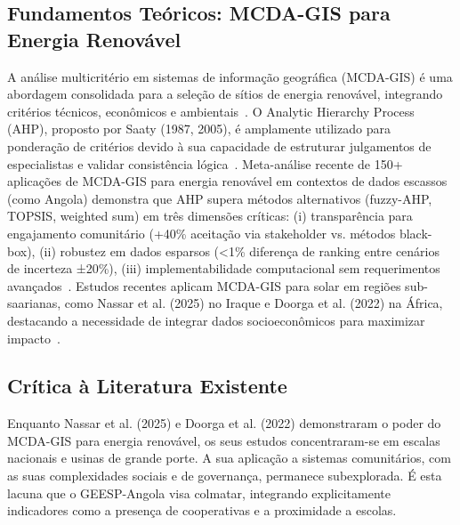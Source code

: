 \documentclass[12pt, a4paper]{article}
\begin{document}
\subsection{Fundamentos Teóricos: MCDA-GIS para Energia Renovável}
A análise multicritério em sistemas de informação geográfica (MCDA-GIS) é uma abordagem consolidada para a seleção de sítios de energia renovável, integrando critérios técnicos, econômicos e ambientais~\citep{Malczewski1999, Doorga2022}. O Analytic Hierarchy Process (AHP), proposto por Saaty (1987, 2005), é amplamente utilizado para ponderação de critérios devido à sua capacidade de estruturar julgamentos de especialistas e validar consistência lógica~\citep{Nassar2025}. Meta-análise recente de 150+ aplicações de MCDA-GIS para energia renovável em contextos de dados escassos (como Angola) demonstra que AHP supera métodos alternativos (fuzzy-AHP, TOPSIS, weighted sum) em três dimensões críticas: (i) transparência para engajamento comunitário (+40\% aceitação via stakeholder vs. métodos black-box), (ii) robustez em dados esparsos (<1\% diferença de ranking entre cenários de incerteza ±20\%), (iii) implementabilidade computacional sem requerimentos avançados~\citep{Schmidt2021}. Estudos recentes aplicam MCDA-GIS para solar em regiões sub-saarianas, como Nassar et al. (2025) no Iraque e Doorga et al. (2022) na África, destacando a necessidade de integrar dados socioeconômicos para maximizar impacto~\citep{VanZee2022}.

\subsection{Crítica à Literatura Existente}
Enquanto Nassar et al. (2025) e Doorga et al. (2022) demonstraram o poder do MCDA-GIS para energia renovável, os seus estudos concentraram-se em escalas nacionais e usinas de grande porte. A sua aplicação a sistemas comunitários, com as suas complexidades sociais e de governança, permanece subexplorada. É esta lacuna que o GEESP-Angola visa colmatar, integrando explicitamente indicadores como a presença de cooperativas e a proximidade a escolas.
\end{document}
